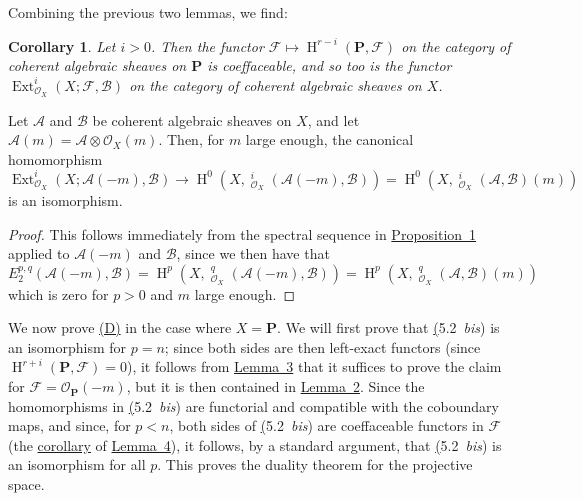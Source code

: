\documentclass{article}
\theoremstyle{plain}
\newenvironment{lemma}[1]
  {\renewcommand\theinnerlemma{#1}\innerlemma}
  {\endinnerlemma}
\newtheorem*{corollary*}{Corollary}
\theoremstyle{definition}
\newcommand{\scr}[1]{{\mathscr{#1}}}
\newcommand{\bb}{\mathbf}
\DeclareMathOperator{\Ext}{Ext}
\DeclareMathOperator{\shExt}{\underline{Ext}}
\DeclareMathOperator{\HH}{H}
\newcommand{\oldpage}[1]{\marginpar{\footnotesize$\Big\vert$ \textit{p.~#1}}}
\begin{document}
Combining the previous two lemmas, we find:

\begin{corollary*}
\label{lemma3andlemma4corollary}
  Let $i>0$.
  Then the functor $\scr{F}\mapsto\HH^{r-i}(\bb{P},\scr{F})$ on the category of coherent algebraic sheaves on $\bb{P}$ is coeffaceable, and so too is the functor $\Ext_{\scr{O}_X}^i(X;\scr{F},\scr{B})$ on the category of coherent algebraic sheaves on $X$.
\end{corollary*}

\oldpage{149-16}
\begin{lemma}{5}
\label{lemma5}
  Let $\scr{A}$ and $\scr{B}$ be coherent algebraic sheaves on $X$, and let $\scr{A}(m)=\scr{A}\otimes\scr{O}_X(m)$.
  Then, for $m$ large enough, the canonical homomorphism
  \[
    \Ext_{\scr{O}_X}^i(X;\scr{A}(-m),\scr{B})
    \to \HH^0(X,\shExt_{\scr{O}_X}^i(\scr{A}(-m),\scr{B}))
    = \HH^0(X,\shExt_{\scr{O}_X}^i(\scr{A},\scr{B})(m))
  \]
  is an isomorphism.
\end{lemma}

\begin{proof}
  This follows immediately from the spectral sequence in \hyperref[proposition1]{Proposition~1} applied to $\scr{A}(-m)$ and $\scr{B}$, since we then have that
  \[
    E_2^{p,q}(\scr{A}(-m),\scr{B})
    = \HH^p(X,\shExt_{\scr{O}_X}^q(\scr{A}(-m),\scr{B}))
    = \HH^p(X,\shExt_{\scr{O}_X}^q(\scr{A},\scr{B})(m))
  \]
  which is zero for $p>0$ and $m$ large enough.
\end{proof}

We now prove \hyperref[(D)]{(D)} in the case where $X=\bb{P}$.
We will first prove that \hyperref[5.2bis](5.2~\emph{bis}) is an isomorphism for $p=n$;
since both sides are then left-exact functors (since $\HH^{r+i}(\bb{P},\scr{F})=0$), it follows from \hyperref[lemma3]{Lemma~3} that it suffices to prove the claim for $\scr{F}=\scr{O}_\bb{P}(-m)$, but it is then contained in \hyperref[lemma2]{Lemma~2}.
Since the homomorphisms in \hyperref[5.2bis](5.2~\emph{bis}) are functorial and compatible with the coboundary maps, and since, for $p<n$, both sides of \hyperref[5.2bis](5.2~\emph{bis}) are coeffaceable functors in $\scr{F}$ (the \hyperref[lemma3andlemma4corollary]{corollary} of \hyperref[lemma4]{Lemma~4}), it follows, by a standard argument, that \hyperref[5.2bis](5.2~\emph{bis}) is an isomorphism for all $p$.
This proves the duality theorem for the projective space.
\end{document}

